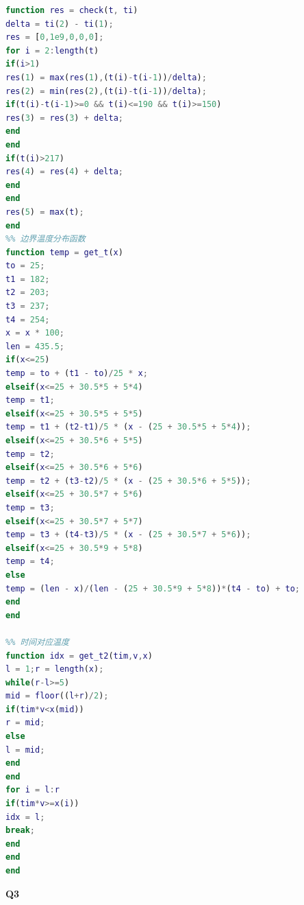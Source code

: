 \documentclass[a4paper,12pt]{ctexart} %
\begin{document}
\begin{lstlisting}[language=matlab]
%% 炉温曲线检验
function res = check(t, ti)
delta = ti(2) - ti(1);
res = [0,1e9,0,0,0];
for i = 2:length(t)
if(i>1)
res(1) = max(res(1),(t(i)-t(i-1))/delta);
res(2) = min(res(2),(t(i)-t(i-1))/delta);
if(t(i)-t(i-1)>=0 && t(i)<=190 && t(i)>=150)
res(3) = res(3) + delta;
end
end
if(t(i)>217)
res(4) = res(4) + delta;
end
end
res(5) = max(t);
end
%% 边界温度分布函数
function temp = get_t(x)
to = 25;
t1 = 182;
t2 = 203;
t3 = 237;
t4 = 254;
x = x * 100;
len = 435.5;
if(x<=25)
temp = to + (t1 - to)/25 * x;
elseif(x<=25 + 30.5*5 + 5*4)
temp = t1;
elseif(x<=25 + 30.5*5 + 5*5)
temp = t1 + (t2-t1)/5 * (x - (25 + 30.5*5 + 5*4));
elseif(x<=25 + 30.5*6 + 5*5)
temp = t2;
elseif(x<=25 + 30.5*6 + 5*6)
temp = t2 + (t3-t2)/5 * (x - (25 + 30.5*6 + 5*5));
elseif(x<=25 + 30.5*7 + 5*6)
temp = t3;
elseif(x<=25 + 30.5*7 + 5*7)
temp = t3 + (t4-t3)/5 * (x - (25 + 30.5*7 + 5*6));
elseif(x<=25 + 30.5*9 + 5*8)
temp = t4;
else
temp = (len - x)/(len - (25 + 30.5*9 + 5*8))*(t4 - to) + to;
end
end

%% 时间对应温度
function idx = get_t2(tim,v,x)
l = 1;r = length(x);
while(r-l>=5)
mid = floor((l+r)/2);
if(tim*v<x(mid))
r = mid;
else
l = mid;
end
end
for i = l:r
if(tim*v>=x(i))
idx = l;
break;
end
end
end
\end{lstlisting}
	\noindent\normalsize\textbf{Q3}
\end{document}
